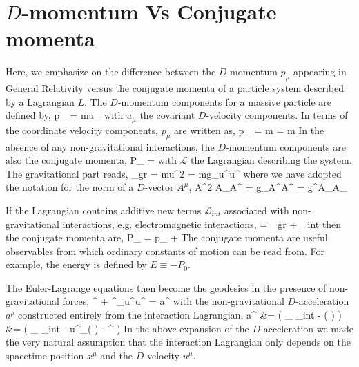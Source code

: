 \section{$D$-momentum Vs Conjugate momenta}
\label{ApC}

Here, we emphasize on the difference between the $D$-momentum $p_{\mu}$ appearing in General Relativity versus the conjugate momenta of a particle system described by a Lagrangian $L$. The $D$-momentum components for a massive particle are defined by,
\be
	p_{\mu} = mu_{\mu}
\ee
with $u_{\mu}$ the covariant $D$-velocity components. In terms of the coordinate velocity components, $p_{\mu}$ are written as,
\be
	p_{\mu} = m = m
\ee
In the absence of any non-gravitational interactions, the $D$-momentum components are also the conjugate momenta,
\be
	P_{\mu} = 
\ee
with $\mathcal{L}$ the Lagrangian describing the system. The gravitational part reads,
\be
	_{gr} = mu^2 = mg_{\mu\nu}u^{\mu}u^{\nu}
\ee
where we have adopted the notation for the norm of a $D$-vector $A^{\mu}$,
\be
	A^2 \equiv A_{\mu}A^{\mu} = g_{\mu\nu}A^{\mu}A^{\nu} = g^{\mu\nu}A_{\mu}A_{\nu}
\ee

If the Lagrangian contains additive new terms $\mathcal{L}_{int}$ associated with non-gravitational interactions, e.g. electromagnetic interactions,
\be
	 = _{gr} + _{int}
\ee
then the conjugate momenta are,
\be
	P_{\mu} = p_{\mu} + 
\ee
The conjugate momenta are useful observables from which ordinary constants of motion can be read from. For example, the energy is defined by $E \equiv -P_{0}$.

The Euler-Lagrange equations then become the geodesics in the presence of non-gravitational forces,
\be
	^{\rho} + \Gamma^{\rho}_{\mu\nu}u^{\mu}u^{\nu} = a^{\rho}
\ee
with the non-gravitational $D$-acceleration $a^{\rho}$ constructed entirely from the interaction Lagrangian,
\be\ba
	a^{\rho} &= \left( \partial_{\mu} _{int} - \left(  \right) \right) \\
	&= \left( \partial_{\mu} _{int} - u^{\nu}\partial_{\nu}\left(  \right) - ^{\nu} \right)
\ea\ee
In the above expansion of the $D$-acceleration we made the very natural assumption that the interaction Lagrangian only depends on the spacetime position $x^{\mu}$ and the $D$-velocity $u^{\mu}$.

